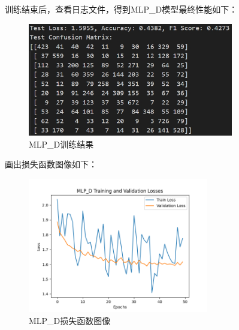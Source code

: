 \documentclass[UTF8]{ctexart}
\begin{document}
\newpage

训练结束后，查看日志文件，得到MLP\_D模型最终性能如下：
\begin{figure}[h]
    \centering
    \includegraphics[width=0.8\textwidth]{MLP_D_res.png}
    \caption*{MLP\_D训练结果}
\end{figure}

画出损失函数图像如下：
\begin{figure}[h]
    \centering
    \includegraphics[width=0.7\textwidth]{MLP_D_loss_curve.png}
    \caption*{MLP\_D损失函数图像}
\end{figure}

\newpage
\end{document}

